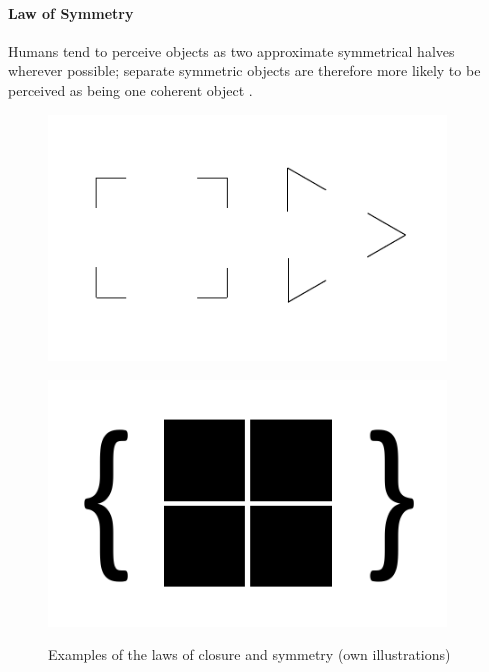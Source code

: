 \paragraph*{Law of Symmetry} Humans tend to perceive objects as two approximate symmetrical halves wherever possible; separate symmetric objects are therefore more likely to be perceived as being one coherent object \parencite[cf.][]{Soegaard.n.y.}.
\begin{figure}[H] 
    \begin{minipage}[b]{.5\linewidth}
        \centering\includegraphics[width=0.94\textwidth]{img/closure.pdf}
        \label{fig:clo}
    \end{minipage}%
    \begin{minipage}[b]{.5\linewidth}
        \centering\includegraphics[width=0.94\textwidth]{img/symmetry.pdf}
        \label{fig:sym}
    \end{minipage}
    \caption[Laws of Closure and Symmetry]{Examples of the laws of closure and symmetry (own illustrations)}\label{fig:law2}
\end{figure}
